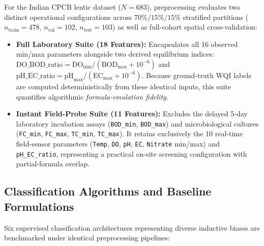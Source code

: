 \documentclass[pdflatex,sn-mathphys-num]{sn-jnl}%
\theoremstyle{thmstyleone}%
\theoremstyle{thmstyletwo}%
\theoremstyle{thmstylethree}%
\begin{document}
For the Indian CPCB lentic dataset ($N = 683$), preprocessing evaluates two distinct operational configurations across $70\%/15\%/15\%$ stratified partitions ($n_{\text{train}} = 478$, $n_{\text{val}} = 102$, $n_{\text{test}} = 103$) as well as full-cohort spatial cross-validation:
\begin{itemize}
    \item \textbf{Full Laboratory Suite (18 Features):} Encapsulates all 16 observed min/max parameters alongside two derived equilibrium indices: $\text{DO\_BOD\_ratio} = \text{DO}_{\min} / (\text{BOD}_{\max} + 10^{-6})$ and $\text{pH\_EC\_ratio} = \text{pH}_{\max} / (\text{EC}_{\max} + 10^{-6})$. Because ground-truth WQI labels are computed deterministically from these identical inputs, this suite quantifies algorithmic \textit{formula-emulation fidelity}.
    \item \textbf{Instant Field-Probe Suite (11 Features):} Excludes the delayed 5-day laboratory incubation assays (\texttt{BOD\_min}, \texttt{BOD\_max}) and microbiological cultures (\texttt{FC\_min}, \texttt{FC\_max}, \texttt{TC\_min}, \texttt{TC\_max}). It retains exclusively the 10 real-time field-sensor parameters (\texttt{Temp}, \texttt{DO}, \texttt{pH}, \texttt{EC}, \texttt{Nitrate} min/max) and \texttt{pH\_EC\_ratio}, representing a practical on-site screening configuration with partial-formula overlap.
\end{itemize}


\subsection{Classification Algorithms and Baseline Formulations}\label{subsec4_3}

Six supervised classification architectures representing diverse inductive biases are benchmarked under identical preprocessing pipelines:
\end{document}
